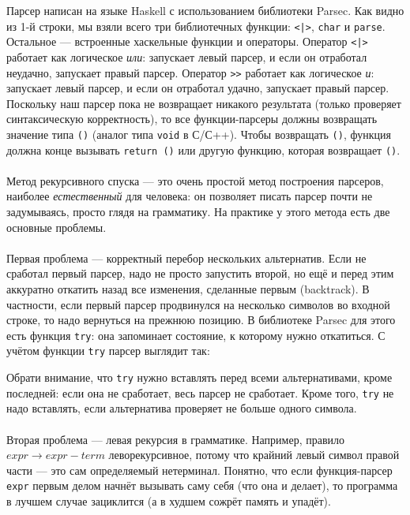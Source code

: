 \documentclass[11pt]{book}
\begin{document}

Парсер написан на языке Haskell с использованием библиотеки Parsec.
Как видно из 1-й строки, мы взяли всего три библиотечных функции: \texttt{<|>}, \texttt{char} и \texttt{parse}.
Остальное --- встроенные хаскельные функции и операторы.
Оператор \texttt{<|>} работает как логическое \emph{или}: запускает левый парсер,
и если он отработал неудачно, запускает правый парсер.
Оператор \texttt{>\thinspace >} работает как логическое \emph{и}: запускает левый парсер,
и если он отработал удачно, запускает правый парсер.
Поскольку наш парсер пока не возвращает никакого результата (только проверяет синтаксическую корректность),
то все функции-парсеры должны возвращать значение типа \texttt{()} 
(аналог типа \texttt{void} в С/С++). Чтобы возвращать \texttt{()},
функция должна конце вызывать \texttt{return ()} или другую функцию, которая возвращает \texttt{()}.
\\ \\
Метод рекурсивного спуска --- это очень простой метод
построения парсеров, наиболее \emph{естественный} для человека: он позволяет писать парсер почти не задумываясь,
просто глядя на грамматику. На практике у этого метода есть две основные проблемы.
\\ \\
Первая проблема --- корректный перебор нескольких альтернатив. Если не сработал первый парсер, надо не просто
запустить второй, но ещё и перед этим аккуратно откатить назад все изменения, сделанные первым (backtrack).
В частности, если первый парсер продвинулся на несколько символов во входной строке,
то надо вернуться на прежнюю позицию. В библиотеке Parsec для этого есть функция \texttt{try}:
она запоминает состояние, к которому нужно откатиться.
С учётом функции \texttt{try} парсер выглядит так:

Обрати внимание, что \texttt{try} нужно вставлять перед всеми альтернативами,
кроме последней: если она не сработает, весь парсер не сработает. Кроме того, \texttt{try}
не надо вставлять, если альтернатива проверяет не больше одного символа.
\\ \\
Вторая проблема --- левая рекурсия в грамматике. Например, правило $expr \rightarrow expr - term$ леворекурсивное,
потому что крайний левый символ правой части --- это сам определяемый нетерминал.
Понятно, что если функция-парсер \texttt{expr} первым делом начнёт
вызывать саму себя (что она и делает), то программа в лучшем случае зациклится (а в худшем сожрёт память и упадёт).
\end{document}
